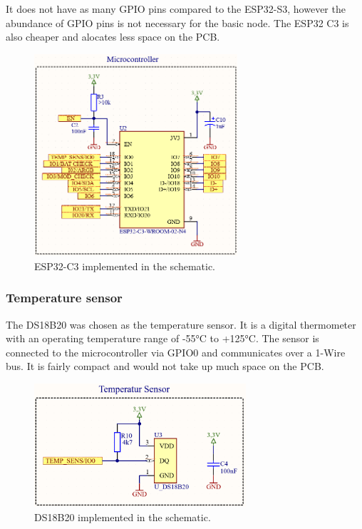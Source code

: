        It does not have as many GPIO pins compared to the ESP32-S3, however the abundance
        of GPIO pins is not necessary for the basic node. The ESP32 C3 is also cheaper and 
        alocates less space on the PCB.

        \begin{figure}[H]
            \centering
            \includegraphics[height = 7.5cm]{assets/HW/ESP32-C3-schematic.png}
            \caption{ESP32-C3 implemented in the schematic.}
        \end{figure}


    \subsubsection{Temperature sensor}
        The DS18B20 was chosen as the temperature sensor. It is a digital thermometer
        with an operating temperature range of -55°C to +125°C. The sensor is connected
        to the microcontroller via GPIO0 and communicates over a 1-Wire bus.
        It is fairly compact and would not take up much space on the PCB.

        \begin{figure}[H]
            \centering
            \includegraphics[width=0.7\textwidth]{assets/HW/DS18B20-schematic.png}
            \caption{DS18B20 implemented in the schematic.}
        \end{figure}

